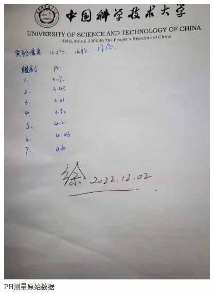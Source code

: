 \documentclass[12pt]{ctexart}
\numberwithin{equation}{section}
\begin{document}
\begin{figure}[ht]
    \centering
    \includegraphics[width=1\textwidth]{原始数据.jpg}
    \caption{PH测量原始数据}
    \label{fig:674567}
\end{figure}

\pagebreak
\end{document}
